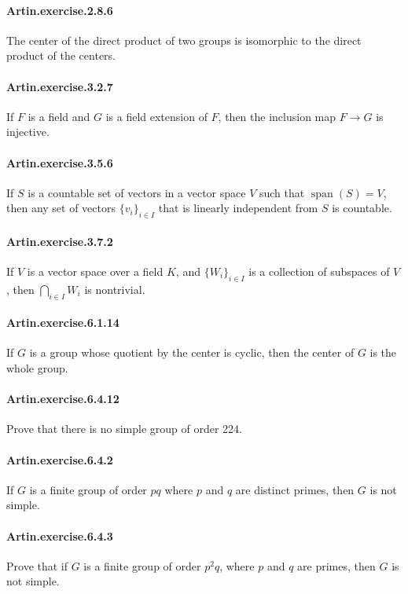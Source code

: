 \documentclass{article}
\begin{document}
\paragraph{Artin.exercise.2.8.6} The center of the direct product of two groups is isomorphic to the direct product of the centers.

\paragraph{Artin.exercise.3.2.7} If $F$ is a field and $G$ is a field extension of $F$, then the inclusion map $F\to G$ is injective.

\paragraph{Artin.exercise.3.5.6} If $S$ is a countable set of vectors in a vector space $V$ such that $\operatorname{span}(S)=V$, then any set of vectors $\{v_i\}_{i\in I}$ that is linearly independent from $S$ is countable.

\paragraph{Artin.exercise.3.7.2} If $V$ is a vector space over a field $K$, and $\{W_i\}_{i\in I}$ is a collection of subspaces of $V$, then $\bigcap_{i\in I} W_i$ is nontrivial.

\paragraph{Artin.exercise.6.1.14} If $G$ is a group whose quotient by the center is cyclic, then the center of $G$ is the whole group.

\paragraph{Artin.exercise.6.4.12} Prove that there is no simple group of order 224.

\paragraph{Artin.exercise.6.4.2} If $G$ is a finite group of order $pq$ where $p$ and $q$ are distinct primes, then $G$ is not simple.

\paragraph{Artin.exercise.6.4.3} Prove that if $G$ is a finite group of order $p^2q$, where $p$ and $q$ are primes, then $G$ is not simple.
\end{document}
